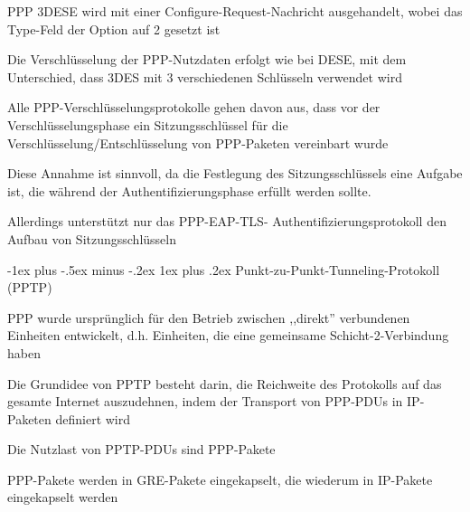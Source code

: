 \documentclass[a4paper]{article}
\makeatletter
\renewcommand{\subsubsection}{\@startsection{subsubsection}{3}{0mm}%
 {-1ex plus -.5ex minus -.2ex}%
 {1ex plus .2ex}%
 {\normalfont\small\bfseries}}
\makeatother
\begin{document}
\begin{multicols}{3}
\begin{itemize*}
\begin{itemize*}
                  \item PPP 3DESE wird mit einer Configure-Request-Nachricht ausgehandelt, wobei das Type-Feld der Option auf 2 gesetzt ist
                  \item Die Verschlüsselung der PPP-Nutzdaten erfolgt wie bei DESE, mit dem Unterschied, dass 3DES mit 3 verschiedenen Schlüsseln verwendet wird
            \end{itemize*}
            \item Alle PPP-Verschlüsselungsprotokolle gehen davon aus, dass vor der Verschlüsselungsphase ein Sitzungsschlüssel für die Verschlüsselung/Entschlüsselung von PPP-Paketen vereinbart wurde
            \item Diese Annahme ist sinnvoll, da die Festlegung des Sitzungsschlüssels eine Aufgabe ist, die während der Authentifizierungsphase erfüllt werden sollte.
            \item Allerdings unterstützt nur das PPP-EAP-TLS- Authentifizierungsprotokoll den Aufbau von Sitzungsschlüsseln
      \end{itemize*}

      \subsubsection{Punkt-zu-Punkt-Tunneling-Protokoll (PPTP)}
      \begin{itemize*}
            \item PPP wurde ursprünglich für den Betrieb zwischen ,,direkt'' verbundenen Einheiten entwickelt, d.h. Einheiten, die eine gemeinsame Schicht-2-Verbindung haben
            \item Die Grundidee von PPTP besteht darin, die Reichweite des Protokolls auf das gesamte Internet auszudehnen, indem der Transport von PPP-PDUs in IP-Paketen definiert wird
            \item Die Nutzlast von PPTP-PDUs sind PPP-Pakete %
            \item PPP-Pakete werden in GRE-Pakete eingekapselt, die wiederum in IP-Pakete eingekapselt werden
      \end{itemize*}



\end{multicols}
\end{document}

